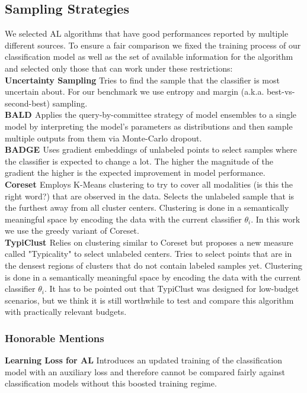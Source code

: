 \documentclass[]{article}
\begin{document}
\subsection{Sampling Strategies}\label{sec:sampling_strategies}
We selected AL algorithms that have good performances reported by multiple different sources.
To ensure a fair comparison we fixed the training process of our classification model as well as the set of available information for the algorithm and selected only those that can work under these restrictions:\\
\textbf{Uncertainty Sampling} 
Tries to find the sample that the classifier is most uncertain about. For our benchmark we use entropy and margin (a.k.a. best-vs-second-best) sampling.\\
\textbf{BALD \cite{kirsch2019batchbald}}
Applies the query-by-committee strategy of model ensembles to a single model by interpreting the model's parameters as distributions and then sample multiple outputs from them via Monte-Carlo dropout.\\
\textbf{BADGE \cite{ashdeep}} Uses gradient embeddings of unlabeled points to select samples where the classifier is expected to change a lot. The higher the magnitude of the gradient the higher is the expected improvement in model performance.\\
\textbf{Coreset \cite{sener2017active}}
Employs K-Means clustering to try to cover all {\color{red}modalities (is this the right word?)} that are observed in the data.
Selects the unlabeled sample that is the furthest away from all cluster centers.
Clustering is done in a semantically meaningful space by encoding the data with the current classifier $\theta_i$.
In this work we use the greedy variant of Coreset.\\
\textbf{TypiClust \cite{hacohen2022active}}
Relies on clustering similar to Coreset but proposes a new measure called "Typicality" to select unlabeled centers.
Tries to select points that are in the densest regions of clusters that do not contain labeled samples yet.
Clustering is done in a semantically meaningful space by encoding the data with the current classifier $\theta_i$.
It has to be pointed out that TypiClust was designed for low-budget scenarios, but we think it is still worthwhile to test and compare this algorithm with practically relevant budgets.
%
\subsubsection{Honorable Mentions}
\textbf{Learning Loss for AL}
Introduces an updated training of the classification model with an auxiliary loss and therefore cannot be compared fairly against classification models without this boosted training regime.
\end{document}
